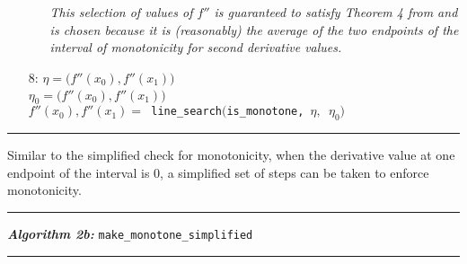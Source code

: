 \documentclass{article}
\begin{document}
\begin{itemize}
  \begin{itemize}
    \item[] \textit{This selection of values of $f''$ is guaranteed to satisfy Theorem 4 from \cite{ulrich1994positivity} and is chosen because it is (reasonably) the average of the two endpoints of the interval of monotonicity for second derivative values.}
  \end{itemize}

\item[8:] $\eta = \big(f''(x_0), f''(x_1)\big)$\\$\eta_0 = \big(\hat f''(x_0), f''(x_1)\big)$\\$f''(x_0), f''(x_1) = $\texttt{ line\_search$\big($is\_monotone, $\eta,$ $\eta_0\big)$}
\end{itemize}
\hrule
\vspace{10pt}


Similar to the simplified check for monotonicity, when the derivative value at one endpoint of the interval is $0$, a simplified set of steps can be taken to enforce monotonicity.

\vspace{10pt}
\hrule
\vspace{3pt}
\noindent\textbf{\textit{Algorithm 2b:}} \texttt{make\_monotone\_simplified}
\vspace{3pt}
\hrule
\end{document}
